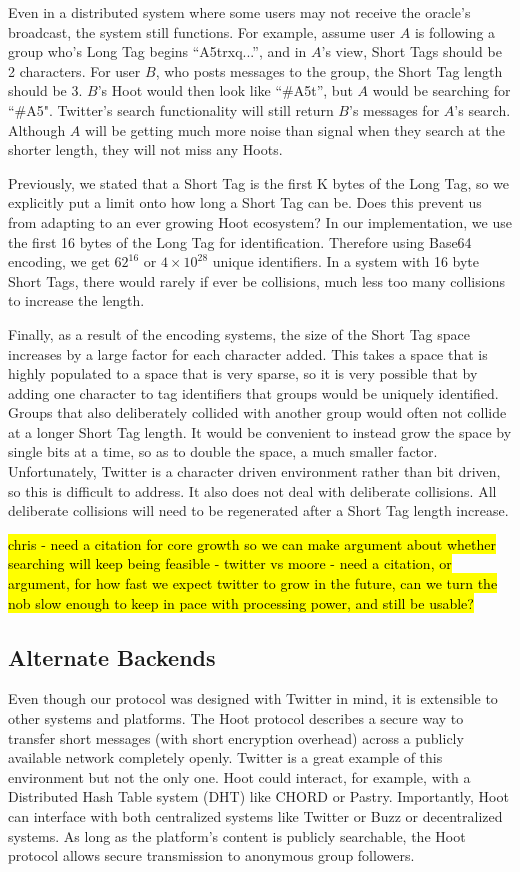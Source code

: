 Even in a distributed system where some users may not receive the oracle's broadcast, the system still functions. For example, assume user $A$ is following a group who's Long Tag begins ``A5trxq...'', and in $A$'s view, Short Tags should be 2 characters. For user $B$, who posts messages to the group, the Short Tag length should be 3. $B$'s Hoot would then look like ``\#A5t'', but $A$ would be searching for ``\#A5". Twitter's search functionality will still return $B$'s messages for $A$'s search. Although $A$ will be getting much more noise than signal when they search at the shorter length, they will not miss any Hoots.

Previously, we stated that a Short Tag is the first K bytes of the Long Tag, so we explicitly put a limit onto how long a Short Tag can be. Does this prevent us from adapting to an ever growing Hoot ecosystem? In our implementation, we use the first 16 bytes of the Long Tag for identification. Therefore using Base64 encoding, we get $62^{16}$ or $4\times10^{28}$ unique identifiers. In a system with 16 byte Short Tags, there would rarely if ever be collisions, much less too many collisions to increase the length.

Finally, as a result of the encoding systems, the size of the Short Tag space increases by a large factor for each character added. This takes a space that is highly populated to a space that is very sparse, so it is very possible that by adding one character to tag identifiers that groups would be uniquely identified. Groups that also deliberately collided with another group would often not collide at a longer Short Tag length. It would be convenient to instead grow the space by single bits at a time, so as to double the space, a much smaller factor. Unfortunately, Twitter is a character driven environment rather than bit driven, so this is difficult to address. It also does not deal with deliberate collisions. All deliberate collisions will need to be regenerated after a Short Tag length increase.


\hl{
chris 
- need a citation for core growth so we can make argument about whether searching will keep being feasible
- twitter vs moore
- need a citation, or argument, for how fast we expect twitter to grow in the future, can we turn the nob slow enough to keep in pace with processing power, and still be usable? 
}

\subsection{Alternate Backends}

Even though our protocol was designed with Twitter in mind, it is extensible to other systems and platforms. The Hoot protocol describes a secure way to transfer short messages (with short encryption overhead) across a publicly available network completely openly. Twitter is a great example of this environment but not the only one. Hoot could interact, for example, with a Distributed Hash Table system (DHT) like CHORD or Pastry. Importantly, Hoot can interface with both centralized systems like Twitter or Buzz or decentralized systems. As long as the platform's content is publicly searchable, the Hoot protocol allows secure transmission to anonymous group followers.

